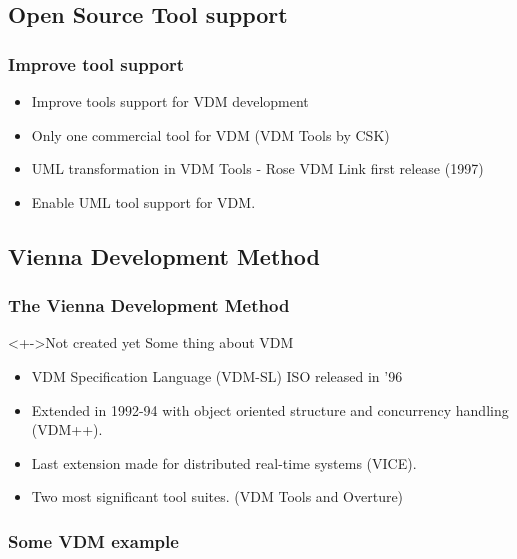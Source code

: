 \subsection{Open Source Tool support}
%
%
\frame
{
  \frametitle{Improve tool support}
\begin{center}
  \begin{itemize}
  		\item Improve tools support for VDM development
  		\item Only one commercial tool for VDM (VDM Tools by CSK)
  		\item UML transformation in VDM Tools - Rose VDM Link first release (1997)
  		\item Enable UML tool support for VDM.
	  	
  \end{itemize}

\end{center}
}

\subsection{Vienna Development Method}
%
%
\frame
{
  \frametitle{The Vienna Development Method}

\begin{center}
	\begin{block}<+->{Not created yet}
	Some thing about VDM
	\end{block}
  \begin{itemize}
  		\item VDM Specification Language (VDM-SL) ISO released in '96
  		\item Extended in 1992-94 with object oriented structure and concurrency handling (VDM++).
  		\item Last extension made for distributed real-time systems (VICE).
  		\item Two most significant tool suites. (VDM Tools and Overture)
	  	
  \end{itemize}

\end{center}
}

%
%
\frame
{
  \frametitle{Some VDM example}

\begin{center}


\end{center}
}

